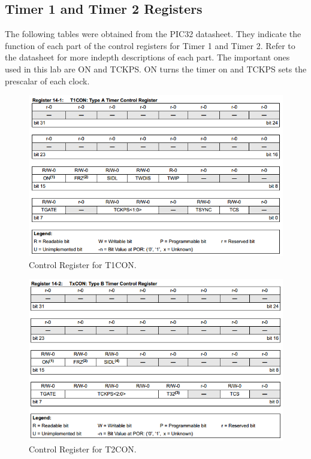 \documentclass[11pt]{article}
\begin{document}
\clearpage

\subsection{Timer 1 and Timer 2 Registers}

The following tables were obtained from the PIC32 datasheet. They indicate the function of each part of the control registers for Timer 1 and Timer 2. Refer to the datasheet for more indepth descriptions of each part. The important ones used in this lab are ON and TCKPS. ON turns the timer on and TCKPS sets the prescalar of each clock.

\begin{figure}[h!]
\centering
\includegraphics[scale=0.8]{T1CON.png}
\caption{Control Register for T1CON.}
\label{fig:t1con}
\end{figure} 

\begin{figure}[h!]
\centering
\includegraphics[scale=0.8]{T2CON.png}
\caption{Control Register for T2CON.}
\label{fig:t2con}
\end{figure} 
\end{document}
